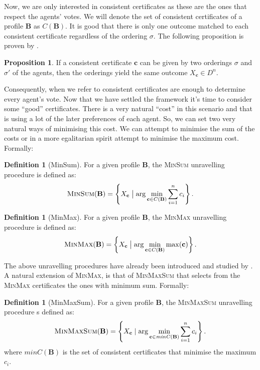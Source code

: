 \documentclass[11pt,a4paper, titlepage]{article}
\theoremstyle{definition}
\newtheorem{definition}[theorem]{Definition}
\newtheorem{proposition}[theorem]{Proposition}
\let\vec\mathbf
\begin{document}
Now, we are only interested in consistent certificates as these are the ones that respect the agents' votes. We will denote the set of consistent certificates of a profile $\mathbf{B}$ as $C(\mathbf{B})$.
It is good that there is only one outcome matched to each consistent certificate regardless of the ordering $\sigma$. The following proposition is proven by \cite{grandi}.

\begin{proposition}
    If a consistent certificate $\mathbf{c}$ can be given by two orderings $\sigma$ and $\sigma'$ of the agents, then the orderings yield the same outcome $X_\mathbf{c} \in D^n$.
\end{proposition}

Consequently, when we refer to consistent certificates are enough to determine every agent's vote. 
Now that we have settled the framework it's time to consider some ``good'' certificates. 
There is a very natural ``cost'' in this scenario and that is using a lot of the later preferences of each agent. 
So, we can set two very natural ways of minimising this cost. 
We can attempt to minimise the sum of the costs or in a more egalitarian spirit attempt to minimise the maximum cost. 
Formally:

\begin{definition}[MinSum]
    For a given profile $\mathbf{B}$, the \textsc{MinSum} unravelling procedure is defined as:
    \[
        \textsc{MinSum}(\mathbf{B}) = 
        \left\{X_{\mathbf{c}} \bigm| \mathrm{arg} \min_{\mathbf{c} \in C(\mathbf{B})} \sum_{i=1}^n c_i\right\}.
    \]
\end{definition}

\begin{definition}[MinMax]
    For a given profile $\mathbf{B}$, the \textsc{MinMax} unravelling procedure is defined as:
    \[
        \textsc{MinMax}(\mathbf{B}) = \left\{X_{\mathbf{c}} \bigm| \mathrm{arg} \min_{\mathbf{c} \in C(\mathbf{B})} \max (\mathbf{c}) \right\}.
    \]
\end{definition}

The above unravelling procedures have already been introduced and studied by  \cite{grandi}. 
A natural extension of \textsc{MinMax}, is that of \textsc{MinMaxSum} that selects from the \textsc{MinMax} certificates the ones with minimum sum. 
Formally:

\begin{definition}[MinMaxSum]
    For a given profile $\mathbf{B}$, the \textsc{MinMaxSum} unravelling procedure s defined as:
    \[
        \textsc{MinMaxSum}(\mathbf{B}) =  \left\{ X_{\mathbf{c}}\mid \arg  \min_{\vec{c} \in \mathit{minC}(\mathbf{B})} \sum_{i=1}^n c_i \right\}.
    \]
    where $\mathit{minC}(\vec{B})$ is the set of consistent certificates that minimise the maximum $c_i$. 
\end{definition}
\end{document}
